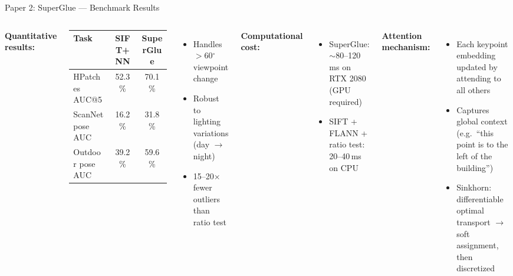 \documentclass[aspectratio=169, 11pt]{beamer}
\begin{document}
\begin{frame}{Paper 2: SuperGlue --- Benchmark Results}
\small
\begin{columns}[T]
\textbf{Quantitative results:}
\begin{table}
\centering
\begin{tabular}{lcc}
\toprule
\textbf{Task} & \textbf{SIFT+NN} & \textbf{SuperGlue} \\
\midrule
HPatches AUC@5 & 52.3\% & 70.1\% \\
ScanNet pose AUC & 16.2\% & 31.8\% \\
Outdoor pose AUC & 39.2\% & 59.6\% \\
\bottomrule
\end{tabular}
\end{table}

\vspace{0.3em}
\begin{itemize}
    \item Handles $>$60$^\circ$ viewpoint change
    \item Robust to lighting variations (day $\rightarrow$ night)
    \item 15--20$\times$ fewer outliers than ratio test
\end{itemize}

\textbf{Computational cost:}
\begin{itemize}
    \item SuperGlue: $\sim$80--120\,ms on RTX 2080 (GPU required)
    \item SIFT + FLANN + ratio test: 20--40\,ms on CPU
\end{itemize}

\vspace{0.3em}
\textbf{Attention mechanism:}
\begin{itemize}
    \item Each keypoint embedding updated by attending to all others
    \item Captures global context (e.g.\ ``this point is to the left of the building'')
    \item Sinkhorn: differentiable optimal transport $\rightarrow$ soft assignment, then discretized
\end{itemize}
\end{columns}
\end{frame}
\end{document}
